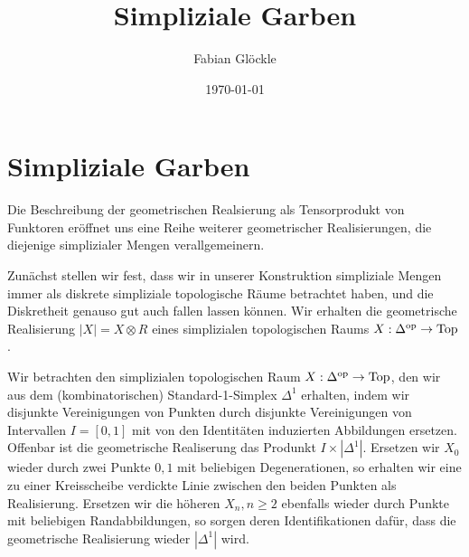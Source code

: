 



\title{Simpliziale Garben}
\author{Fabian Glöckle}
\date{\today}

\section{Simpliziale Garben}

Die Beschreibung der geometrischen Realsierung als Tensorprodukt von
Funktoren eröffnet uns eine Reihe weiterer geometrischer
Realisierungen, die diejenige simplizialer Mengen verallgemeinern.

Zunächst stellen wir fest, dass wir in unserer Konstruktion
simpliziale Mengen immer als diskrete simpliziale topologische Räume
betrachtet haben, und die Diskretheit genauso gut auch fallen lassen
können. Wir erhalten die geometrische Realisierung $|X| = X \otimes R$
eines simplizialen topologischen Raums $X: \Delta^\mathrm{op} \to \operatorname{Top}$.
\begin{bsp}
  Wir betrachten den simplizialen topologischen Raum $X: \Delta^\mathrm{op} \to
  \operatorname{Top}$, den wir aus dem (kombinatorischen) Standard-1-Simplex
  $\Delta^1$ erhalten, indem wir disjunkte Vereinigungen von Punkten
  durch disjunkte Vereinigungen von Intervallen $I = [0, 1]$ mit von
  den Identitäten induzierten Abbildungen ersetzen. Offenbar ist die
  geometrische Realiserung das Produnkt $I \times
  |\Delta^1|$. Ersetzen wir $X_0$ wieder durch zwei Punkte ${0, 1}$
  mit beliebigen Degenerationen, so erhalten wir eine zu einer
  Kreisscheibe verdickte Linie zwischen den beiden Punkten als
  Realisierung. Ersetzen wir die höheren $X_n, n \geq 2$ ebenfalls
  wieder durch Punkte mit beliebigen Randabbildungen, so sorgen deren
  Identifikationen dafür, dass die geometrische Realisierung wieder
  $|\Delta^1|$ wird.
\end{bsp}

